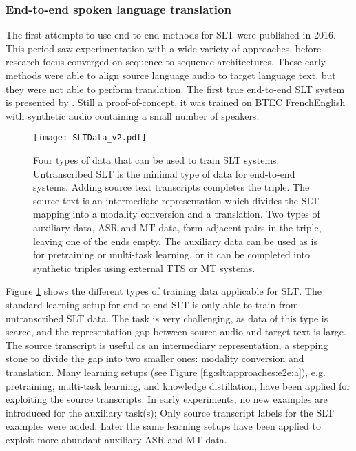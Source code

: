 \documentclass{svjour3}
\newcommand{\lp}[2]{#1#2}
\begin{document}
\subsubsection{End-to-end spoken language translation}
\label{sec:slt:endtoend}



The first attempts to use end-to-end methods for SLT were published in 2016.
This period saw experimentation with a wide variety of approaches,
before research focus converged on sequence-to-sequence architectures.
These early methods
\citep{duong-etal-2016-attentional,anastasopoulos-etal-2016-unsupervised,bansal-etal-2017-towards}
were able to align source language audio to target language text,
but they were not able to perform translation.
The first true end-to-end SLT system is presented by \citet{berard2016listen}.
Still a proof-of-concept,
it was trained on BTEC \lp{French}{English} with synthetic audio containing a small number of speakers.





\begin{figure}[t]
    \centering
    \texttt{[image: SLTData\_v2.pdf]}
    \caption{Four types of data that can be used to train SLT systems. Untranscribed SLT is the minimal type of data for end-to-end systems. Adding source text transcripts completes the triple. The source text is an intermediate representation which divides the SLT mapping into a modality conversion and a translation. Two types of auxiliary data, ASR and MT data, form adjacent pairs in the triple, leaving one of the ends empty. The auxiliary data can be used as is for pretraining or multi-task learning, or it can be completed into synthetic triples using external TTS or MT systems.
    \label{fig:slt:typesofdata}}
\end{figure}



Figure \ref{fig:slt:typesofdata} shows the different types of training data applicable for SLT.
The standard learning setup for end-to-end SLT is only able to train from untranscribed SLT data.
The task is very challenging, as data of this type is scarce, and the representation gap between source audio and target text is large.
The source transcript is useful as an intermediary representation, a stepping stone to divide the gap into two smaller ones:
modality conversion and translation.
Many learning setups (see Figure \ref{fig:slt:approaches:e2e:a}),
e.g. pretraining, multi-task learning, and knowledge distillation,
have been applied for exploiting the source transcripts.
In early experiments,
no new examples are introduced for the auxiliary task(s);
Only source transcript labels for the SLT examples were added.
Later the same learning setups have been applied to exploit more abundant auxiliary ASR and MT data.
\end{document}
